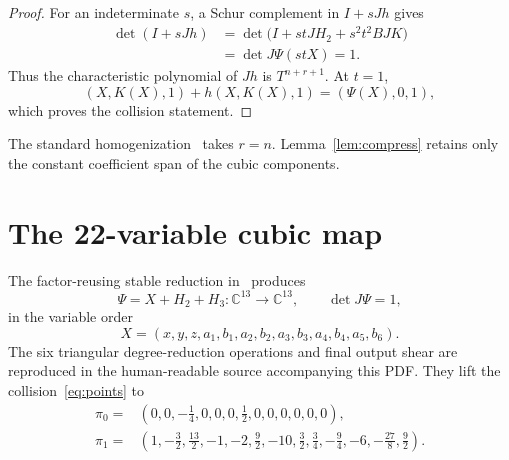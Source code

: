 \documentclass[11pt]{article}
\newcommand{\C}{\mathbb C}
\begin{document}
\begin{proof}
For an indeterminate $s$, a Schur complement in $I+sJh$ gives
\begin{align}
\det(I+sJh)
&=\det\bigl(I+stJH_2+s^2t^2BJK\bigr)\nonumber\\
&=\det J\Psi(stX)=1.
\label{eq:schur}
\end{align}
Thus the characteristic polynomial of $Jh$ is $T^{n+r+1}$. At $t=1$,
\begin{equation}
(X,K(X),1)+h(X,K(X),1)=(\Psi(X),0,1),
\end{equation}
which proves the collision statement.
\end{proof}

The standard homogenization~\cite{bcw} takes $r=n$.
Lemma~\ref{lem:compress} retains only
the constant coefficient span of the cubic components.

\section{The 22-variable cubic map}

The factor-reusing stable reduction in~\cite{kriebel54} produces
\begin{equation}
\Psi=X+H_2+H_3:\C^{13}\to\C^{13},\qquad \det J\Psi=1,
\label{eq:psi13}
\end{equation}
in the variable order
\begin{equation}
X=(x,y,z,a_1,b_1,a_2,b_2,a_3,b_3,a_4,b_4,a_5,b_6).
\end{equation}
The six triangular degree-reduction operations and final output shear are
reproduced in the human-readable source accompanying this PDF. They lift the
collision~\eqref{eq:points} to
\begin{align}
\pi_0={}&(0,0,-\tfrac14,0,0,0,\tfrac12,0,0,0,0,0,0),\nonumber\\
\pi_1={}&(1,-\tfrac32,\tfrac{13}2,-1,-2,\tfrac92,-10,
\tfrac32,\tfrac34,-\tfrac94,-6,-\tfrac{27}8,\tfrac92).
\label{eq:stablepoints}
\end{align}
\end{document}
